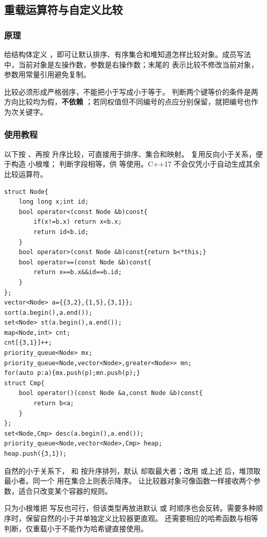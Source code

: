 \subsection{重载运算符与自定义比较}
\label{stl:operators}
\subsubsection*{原理}
给结构体定义 ，即可让默认排序、有序集合和堆知道怎样比较对象。成员写法中，当前对象是左操作数，参数是右操作数；末尾的  表示比较不修改当前对象，参数用常量引用避免复制。

比较必须形成严格弱序，不能把小于写成小于等于。 判断两个键等价的条件是两方向比较均为假，\textbf{不依赖} ；若同权值但不同编号的点应分别保留，就把编号也作为次关键字。
\subsubsection*{使用教程}
以下按 、再按  升序比较，可直接用于排序、集合和映射。 复用反向小于关系，便于构造  小根堆； 判断字段相等，供  等使用。C++17 不会仅凭小于自动生成其余比较运算符。
\begin{lstlisting}[style=mtycpp,numbers=none]
struct Node{
	long long x;int id;
	bool operator<(const Node &b)const{
		if(x!=b.x) return x<b.x;
		return id<b.id;
	}
	bool operator>(const Node &b)const{return b<*this;}
	bool operator==(const Node &b)const{
		return x==b.x&&id==b.id;
	}
};
vector<Node> a={{3,2},{1,5},{3,1}};
sort(a.begin(),a.end());
set<Node> st(a.begin(),a.end());
map<Node,int> cnt;
cnt[{3,1}]++;
priority_queue<Node> mx;
priority_queue<Node,vector<Node>,greater<Node>> mn;
for(auto p:a){mx.push(p);mn.push(p);}
struct Cmp{
	bool operator()(const Node &a,const Node &b)const{
		return b<a;
	}
};
set<Node,Cmp> desc(a.begin(),a.end());
priority_queue<Node,vector<Node>,Cmp> heap;
heap.push({3,1});
\end{lstlisting}
自然的小于关系下， 和  按升序排列，默认  却取最大者；改用  或上述  后，堆顶取最小者。同一个  用在集合上则表示降序。 让比较器对象可像函数一样接收两个参数，适合只改变某个容器的规则。

只为小根堆把  写反也可行，但该类型再放进默认  或  时顺序也会反转。需要多种顺序时，保留自然的小于并单独定义比较器更直观。 还需要相应的哈希函数与相等判断，仅重载小于不能作为哈希键直接使用。
